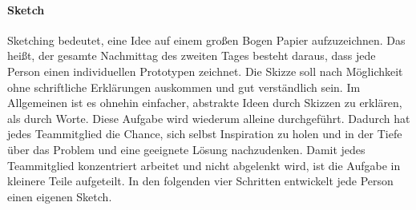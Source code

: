 \paragraph{Sketch}
\label{sec:Sprint-Tag2-Sketch}
Sketching bedeutet, eine Idee auf einem großen Bogen Papier aufzuzeichnen. Das heißt, der gesamte Nachmittag des zweiten Tages besteht daraus, dass jede Person einen individuellen Prototypen zeichnet. Die Skizze soll nach Möglichkeit ohne schriftliche Erklärungen auskommen und gut verständlich sein. Im Allgemeinen ist es ohnehin einfacher, abstrakte Ideen durch Skizzen zu erklären, als durch Worte. Diese Aufgabe wird wiederum alleine durchgeführt. Dadurch hat jedes Teammitglied die Chance, sich selbst Inspiration zu holen und in der Tiefe über das Problem und eine geeignete Lösung nachzudenken. Damit jedes Teammitglied konzentriert arbeitet und nicht abgelenkt wird, ist die Aufgabe in kleinere Teile aufgeteilt. In den folgenden vier Schritten entwickelt jede Person einen eigenen Sketch.
